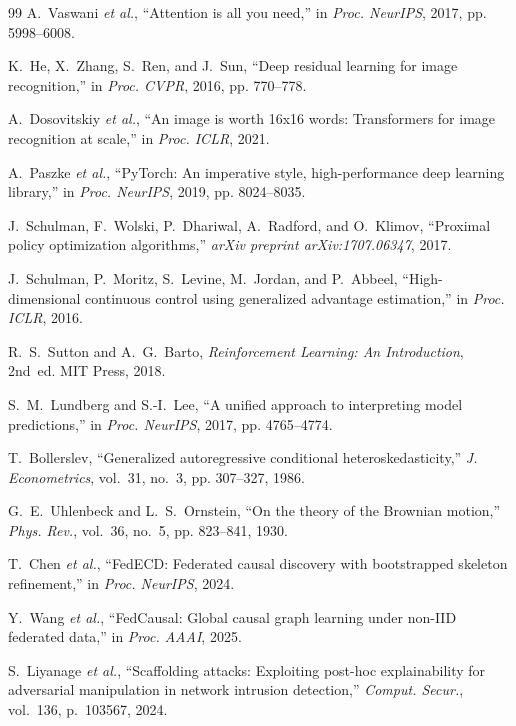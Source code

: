 \documentclass[journal]{IEEEtran}
\begin{document}
\begin{thebibliography}{99}
  A.~Vaswani \emph{et al.},
  ``Attention is all you need,''
  in \emph{Proc. NeurIPS}, 2017, pp. 5998--6008.

  K.~He, X.~Zhang, S.~Ren, and J.~Sun,
  ``Deep residual learning for image recognition,''
  in \emph{Proc. CVPR}, 2016, pp. 770--778.

  A.~Dosovitskiy \emph{et al.},
  ``An image is worth 16x16 words: Transformers for image recognition at scale,''
  in \emph{Proc. ICLR}, 2021.

  A.~Paszke \emph{et al.},
  ``{PyTorch}: An imperative style, high-performance deep learning library,''
  in \emph{Proc. NeurIPS}, 2019, pp. 8024--8035.

  J.~Schulman, F.~Wolski, P.~Dhariwal, A.~Radford, and O.~Klimov,
  ``Proximal policy optimization algorithms,''
  \emph{arXiv preprint arXiv:1707.06347}, 2017.

  J.~Schulman, P.~Moritz, S.~Levine, M.~Jordan, and P.~Abbeel,
  ``High-dimensional continuous control using generalized advantage estimation,''
  in \emph{Proc. ICLR}, 2016.

  R.~S.~Sutton and A.~G.~Barto,
  \emph{Reinforcement Learning: An Introduction}, 2nd~ed.
  MIT Press, 2018.

  S.~M.~Lundberg and S.-I.~Lee,
  ``A unified approach to interpreting model predictions,''
  in \emph{Proc. NeurIPS}, 2017, pp. 4765--4774.

  T.~Bollerslev,
  ``Generalized autoregressive conditional heteroskedasticity,''
  \emph{J. Econometrics}, vol.~31, no.~3, pp. 307--327, 1986.

  G.~E.~Uhlenbeck and L.~S.~Ornstein,
  ``On the theory of the {Brownian} motion,''
  \emph{Phys. Rev.}, vol.~36, no.~5, pp. 823--841, 1930.

  T.~Chen \emph{et al.},
  ``{FedECD}: Federated causal discovery with bootstrapped skeleton refinement,''
  in \emph{Proc. NeurIPS}, 2024.

  Y.~Wang \emph{et al.},
  ``{FedCausal}: Global causal graph learning under non-{IID} federated data,''
  in \emph{Proc. AAAI}, 2025.

  S.~Liyanage \emph{et al.},
  ``Scaffolding attacks: Exploiting post-hoc explainability for adversarial manipulation in network intrusion detection,''
  \emph{Comput. Secur.}, vol.~136, p.~103567, 2024.


\end{thebibliography}
\end{document}
